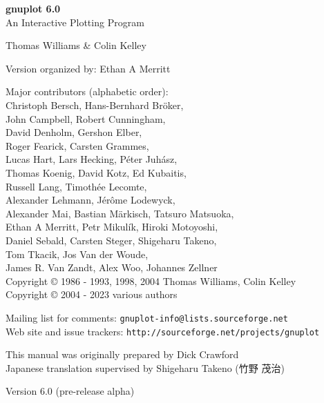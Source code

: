\documentclass[twoside]{article}
\def\gpVersion{6.0}
\def\gnuplotVersion{\usebox\GpVersion}
\begin{document}
\sloppy
\thispagestyle{empty}
\rule{0in}{1.0in}

  \begin{center}

  {\huge\bf {gnuplot \gpVersion}}\\
  \vspace{3ex}
  {\Large An Interactive Plotting Program}\\

  \vspace{2ex}

  \large
  Thomas Williams \& Colin Kelley\\

  \vspace{2ex}

  Version
    {\gnuplotVersion }
  organized by: Ethan A Merritt\\

   \vspace{2ex}

  Major contributors (alphabetic order):\\

  Christoph Bersch,
  Hans-Bernhard Bröker,\\
  John Campbell,
  Robert Cunningham,\\
  David Denholm,
  Gershon Elber,\\
  Roger Fearick,
  Carsten Grammes,\\
  Lucas Hart,
  Lars Hecking,
  Péter Juhász,\\
  Thomas Koenig,
  David Kotz,
  Ed Kubaitis,\\
  Russell Lang,
  Timothée Lecomte,\\
  Alexander Lehmann,
  Jérôme Lodewyck,\\
  Alexander Mai,
  Bastian Märkisch,
  Tatsuro Matsuoka, \\
  Ethan A Merritt,
  Petr Mikulík,
  Hiroki Motoyoshi, \\
  Daniel Sebald,
  Carsten Steger,
  Shigeharu Takeno,\\
  Tom Tkacik,
  Jos Van der Woude,\\
  James R. Van Zandt,
  Alex Woo,
  Johannes Zellner\\
  Copyright {\copyright} 1986 - 1993, 1998, 2004   Thomas Williams, Colin Kelley\\
  Copyright {\copyright} 2004 - 2023  various authors\\

  \vspace{2ex}

  Mailing list for comments: \verb+gnuplot-info@lists.sourceforge.net+\\
  Web site and issue trackers: \verb+http://sourceforge.net/projects/gnuplot+

  \vfill
  This manual was originally prepared by Dick Crawford \\
  Japanese translation supervised by Shigeharu Takeno (竹野 茂治)

  \vspace{2ex}

   Version {\gpVersion} (pre-release alpha)

   \end{center}
\newpage


\hypertarget{TableOfContents}{}
\tableofcontents

\newpage
\end{document}
